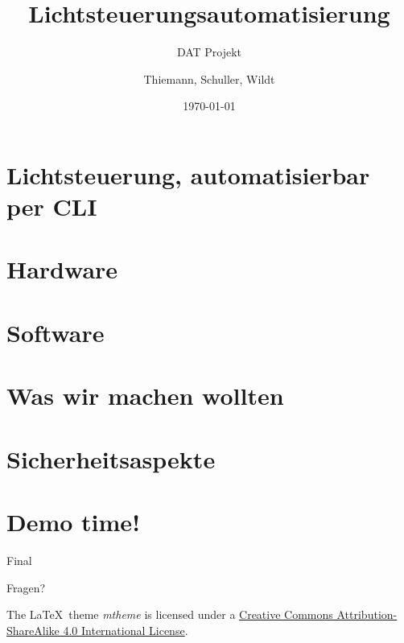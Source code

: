 \documentclass[10pt, compress]{beamer}
\title{Lichtsteuerungsautomatisierung}
\subtitle{DAT Projekt}
\date{\today}
\author{Thiemann, Schuller, Wildt}
\institute{Hochschule Rosenheim}
\begin{document}
\maketitle

\section{Lichtsteuerung, automatisierbar per CLI}



\section{Hardware}



\section{Software}



\section{Was wir machen wollten}



\section{Sicherheitsaspekte}



\section{Demo time!}



\begin{frame}{Final}

  \begin{center}\huge Fragen?\end{center}
    
  \vspace{1cm}
  \begin{center}
  {\small

  The \LaTeX \ theme \emph{mtheme} is licensed under a
  \href{http://creativecommons.org/licenses/by-sa/4.0/}{Creative Commons
  Attribution-ShareAlike 4.0 International License}.}

  \ccbysa
  
  \end{center}

\end{frame}
\end{document}
